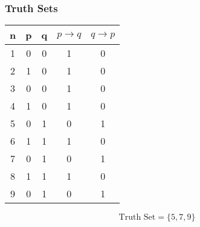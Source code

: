\documentclass{beamer}
\begin{document}
\begin{frame}
\frametitle{Truth Sets}
\Large
\begin{center}
\begin{tabular}{|c||c|c||c||c|}
\hline \phantom{sp} n \phantom{sp} & \phantom{sp} p \phantom{sp} & \phantom{sp}q \phantom{sp}& \phantom{s} $  p \rightarrow q$ \phantom{s}& \phantom{s} $q \rightarrow p$ \phantom{s}\\  \hline
\hline 1 & 0 & 0 & 1 & 0\\ 
\hline 2 & 1 & 0 & 1 & 0\\ 
\hline 3 & 0 & 0 & 1 & 0\\ 
\hline 4 & 1 & 0 & 1 & 0\\ 
\hline 5 & 0 & 1 & 0 & 1\\ 
\hline 6 & 1 & 1 & 1 & 0\\ 
\hline 7 & 0 & 1 & 0 & 1\\ 
\hline 8 & 1 & 1 & 1 & 0\\ 
\hline 9 & 0 & 1 & 0 & 1\\ 
\hline 
\end{tabular} 
\end{center}
\[\mbox{Truth Set} = \{5,7,9\}\]
\end{frame}

\end{document}
